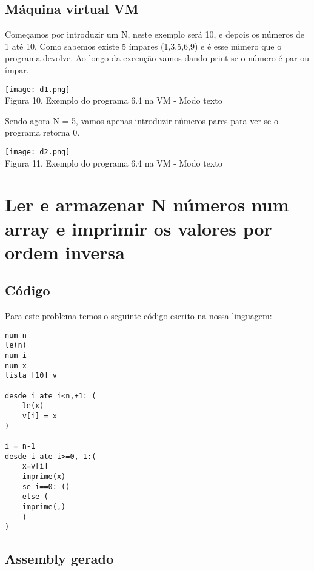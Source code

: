 \documentclass[11pt,a4paper]{report}%
\begin{document}
\subsection{Máquina virtual VM}

Começamos por introduzir um N, neste exemplo será 10, e depois os números de 1 até 10. Como sabemos existe 5 ímpares (1,3,5,6,9) e é esse número que o programa devolve. Ao longo da execução vamos dando print se o número é par ou ímpar.
\begin{center}
    \texttt{[image: d1.png]}
    \\
    \caption{Figura 10. Exemplo do programa 6.4 na VM - Modo texto}
\end{center}

Sendo agora N = 5, vamos apenas introduzir números pares para ver se o programa retorna 0.
\begin{center}
    \texttt{[image: d2.png]}
    \\
    \caption{Figura 11. Exemplo do programa 6.4 na VM - Modo texto}
\end{center}

\section{Ler e armazenar N números num array e imprimir os valores por ordem inversa}

\subsection{Código}

Para este problema temos o seguinte código escrito na nossa linguagem:
\\
\begin{lstlisting}[frame=single,numbers=none]
num n
le(n)
num i 
num x 
lista [10] v

desde i ate i<n,+1: (
    le(x)
    v[i] = x
)

i = n-1
desde i ate i>=0,-1:(
    x=v[i]
    imprime(x)
    se i==0: ()
    else (
    imprime(,)
    )
)
\end{lstlisting}


\subsection{Assembly gerado}
\end{document}
